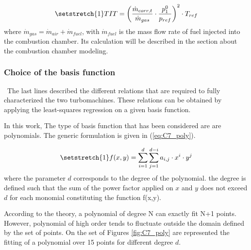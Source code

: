 \begin{equation}
    \setstretch{1}
    TIT = \left(\frac{\dot{m}_{corr,t}}{\dot{m}_{gas}}\cdot\frac{p_1^0}{p_{ref}}\right)^2\cdot T_{ref}\label{eq:C7_TIT}
\end{equation}
where $\dot{m}_{gas} = \dot{m}_{air} + \dot{m}_{fuel}$, with $\dot{m}_{fuel}$ is the mass flow rate of fuel injected into the combustion chamber. Its calculation will be described in the section about the combustion chamber modeling.

\subsubsection{Choice of the basis function}
\quad\ The last lines described the different relations that are required to fully characterized the two turbomachines. These relations can be obtained by applying the least-squares regression on a given basis function. 

In this work, The type of basis function that has been considered are are polynomials. The generic formulation is given in (\ref{eq:C7_poly}).

\begin{equation}
    \setstretch{1}
    f(x,y) = \sum_{i=1}^d\sum_{j=1}^{d-i}a_{i,j}\cdot x^i\cdot y^j \label{eq:C7_poly}
\end{equation}
where the parameter $d$ corresponds to the degree of the polynomial. the degree is defined such that the sum of the power factor applied on $x$ and $y$ does not exceed $d$ for each monomial constituting the function f(x,y).

According to the theory, a polynomial of degree N can exactly fit N+1 points. However, polynomial of high order tends to fluctuate outside the domain defined by the set of points. On the set of Figures \ref{fig:C7_poly} are represented the fitting of a polynomial over 15 points for different degree $d$.

